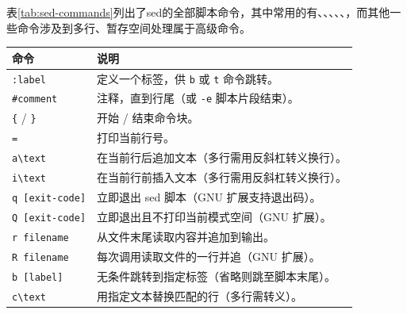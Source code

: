 表\ref{tab:sed-commands}列出了sed的全部脚本命令，其中常用的有、、、、、，而其他一些命令涉及到多行、暂存空间处理属于高级命令。
\begin{table}[htbp]
	\centering
	\footnotesize
	\begin{tabular}{ll}\toprule
		\textbf{命令}                  & \textbf{说明}                                                                                     \\\midrule
		\texttt{:label}                & 定义一个标签，供 \texttt{b} 或 \texttt{t} 命令跳转。                                              \\
		\texttt{\#comment}             & 注释，直到行尾（或 \texttt{-e} 脚本片段结束）。                                                   \\
		\texttt{\{} / \texttt{\}}      & 开始 / 结束命令块。                                                                               \\
		\texttt{=}                     & 打印当前行号。                                                                                    \\
		\texttt{a\textbackslash text}  & 在当前行后追加文本（多行需用反斜杠转义换行）。                                                    \\
		\texttt{i\textbackslash text}  & 在当前行前插入文本（多行需用反斜杠转义换行）。                                                    \\
		\texttt{q [exit-code]}         & 立即退出 sed 脚本（GNU 扩展支持退出码）。                                                         \\
		\texttt{Q [exit-code]}         & 立即退出且不打印当前模式空间（GNU 扩展）。                                                        \\
		\texttt{r filename}            & 从文件末尾读取内容并追加到输出。                                                                  \\
		\texttt{R filename}            & 每次调用读取文件的一行并追（GNU 扩展）。                                                          \\
		\texttt{b [label]}             & 无条件跳转到指定标签（省略则跳至脚本末尾）。                                                      \\
		\texttt{c\textbackslash text}  & 用指定文本替换匹配的行（多行需转义）。                                                            \\

\end{tabular}
\end{table}
